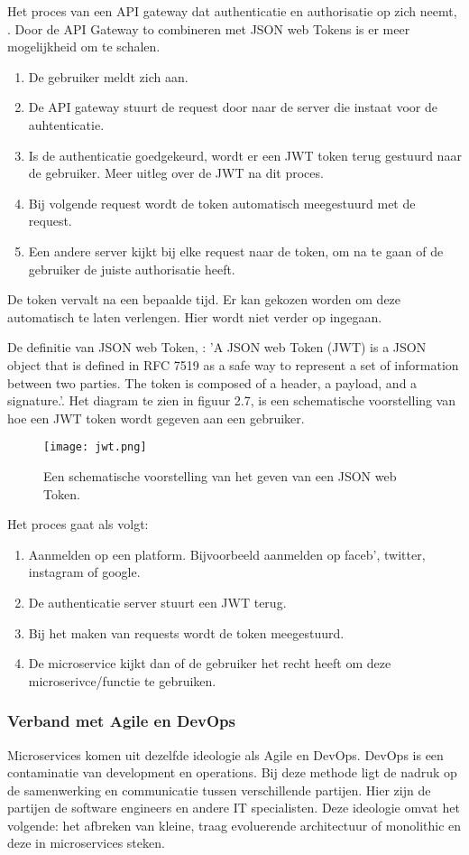 Het proces van een API gateway dat authenticatie en authorisatie op zich neemt, \textcite{Siraj2017}.
Door de API Gateway to combineren met JSON  web Tokens is er meer mogelijkheid om te schalen. 
\begin{enumerate}
	\item De gebruiker meldt zich aan.
	\item De API gateway stuurt de request door naar de server die instaat voor de auhtenticatie.
	\item Is de authenticatie goedgekeurd, wordt er een JWT token terug gestuurd naar de gebruiker. Meer uitleg over de JWT na dit proces.
	\item Bij volgende request wordt de token automatisch meegestuurd met de request.
	\item Een andere server kijkt bij elke request naar de token, om na te gaan of de gebruiker de juiste authorisatie heeft. 
\end{enumerate}
De token vervalt na een bepaalde tijd. Er kan gekozen worden om deze automatisch te laten verlengen. Hier wordt niet verder op ingegaan. 

De definitie van JSON  web Token, \textcite{Stecky-Efantis2016}: 'A JSON  web Token (JWT) is a JSON object that is defined in RFC 7519 as a safe way to represent a set of information between two parties. The token is composed of a header, a payload, and a signature.'. Het diagram te zien in figuur 2.7, is een schematische voorstelling van hoe een JWT token wordt gegeven aan een gebruiker.
\begin{figure}[h]
	\texttt{[image: jwt.png]}
	\centering
	\caption{Een schematische voorstelling van het geven van een JSON  web Token. \textcite{Stecky-Efantis2016}}
\end{figure}
Het proces gaat als volgt:
\begin{enumerate}
	\item Aanmelden op een platform. Bijvoorbeeld aanmelden op faceb', twitter, instagram of google.
	\item De authenticatie server stuurt een JWT terug.
	\item Bij het maken van requests wordt de token meegestuurd.
	\item De microservice kijkt dan of de gebruiker het recht heeft om deze microserivce/functie te gebruiken.
\end{enumerate}


\subsubsection{Verband met Agile en DevOps}
Microservices komen uit dezelfde ideologie als Agile en DevOps. DevOps is een contaminatie  van development en operations. Bij deze methode ligt de nadruk op de samenwerking en communicatie tussen verschillende partijen. Hier zijn de partijen de software engineers en andere IT specialisten. Deze ideologie omvat het volgende: het afbreken van kleine, traag evoluerende architectuur of monolithic en deze in microservices steken.

